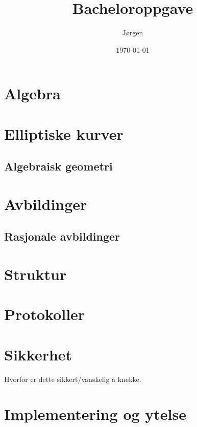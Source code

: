 \documentclass[norsk]{article}
\title{Bacheloroppgave}
\author{Jørgen}
\date{\today}
\theoremstyle{definition}
\begin{document}
\maketitle

\tableofcontents

\newpage


\section{Algebra}


\section{Elliptiske kurver}
\subsection{Algebraisk geometri}


%

\section{Avbildinger}
\subsection{Rasjonale avbildinger}



\section{Struktur}


\section{Protokoller}


\section{Sikkerhet}
Hvorfor er dette sikkert/vanskelig å knekke.

\section{Implementering og ytelse}
 
 
% 

\clearpage
 

\printbibliography
\end{document}
